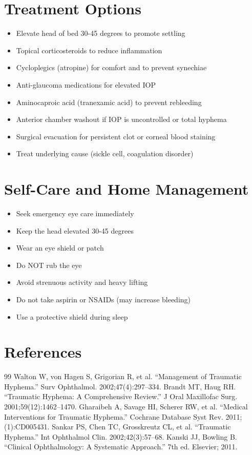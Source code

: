 \section*{Treatment Options}
\begin{itemize}
\item Elevate head of bed 30-45 degrees to promote settling
\item Topical corticosteroids to reduce inflammation
\item Cycloplegics (atropine) for comfort and to prevent synechiae
\item Anti-glaucoma medications for elevated IOP
\item Aminocaproic acid (tranexamic acid) to prevent rebleeding
\item Anterior chamber washout if IOP is uncontrolled or total hyphema
\item Surgical evacuation for persistent clot or corneal blood staining
\item Treat underlying cause (sickle cell, coagulation disorder)
\end{itemize}
\section*{Self-Care and Home Management}
\begin{itemize}
\item Seek emergency eye care immediately
\item Keep the head elevated 30-45 degrees
\item Wear an eye shield or patch
\item Do NOT rub the eye
\item Avoid strenuous activity and heavy lifting
\item Do not take aspirin or NSAIDs (may increase bleeding)
\item Use a protective shield during sleep
\end{itemize}

\section*{References}
\begin{thebibliography}{99}
 Walton W, von Hagen S, Grigorian R, et al. ``Management of Traumatic Hyphema.'' Surv Ophthalmol. 2002;47(4):297--334.
 Brandt MT, Haug RH. ``Traumatic Hyphema: A Comprehensive Review.'' J Oral Maxillofac Surg. 2001;59(12):1462--1470.
 Gharaibeh A, Savage HI, Scherer RW, et al. ``Medical Interventions for Traumatic Hyphema.'' Cochrane Database Syst Rev. 2011;(1):CD005431.
 Sankar PS, Chen TC, Grosskreutz CL, et al. ``Traumatic Hyphema.'' Int Ophthalmol Clin. 2002;42(3):57--68.
 Kanski JJ, Bowling B. ``Clinical Ophthalmology: A Systematic Approach.'' 7th ed. Elsevier; 2011.
\end{thebibliography}

